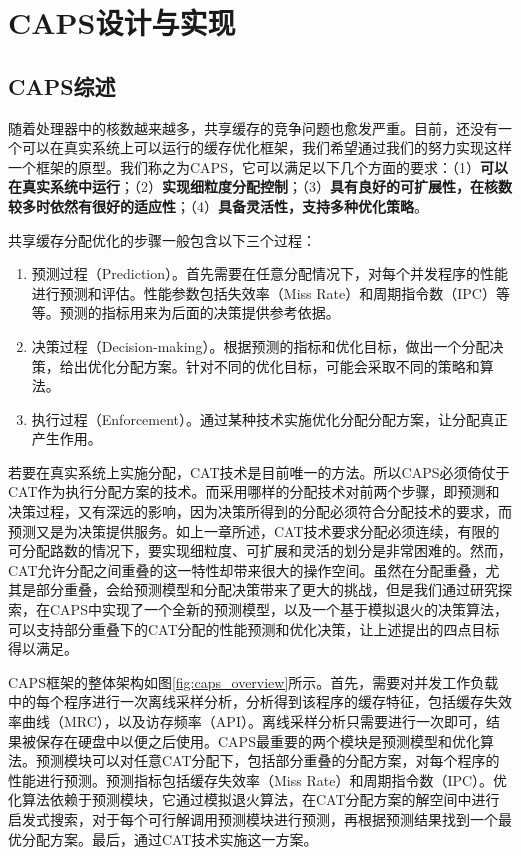 
\chapter{CAPS设计与实现} \label{chap:design}
\section{CAPS综述}
随着处理器中的核数越来越多，共享缓存的竞争问题也愈发严重。目前，还没有一个可以在真实系统上可以运行的缓存优化框架，我们希望通过我们的努力实现这样一个框架的原型。我们称之为CAPS，它可以满足以下几个方面的要求：（1）\textbf{可以在真实系统中运行}；（2）\textbf{实现细粒度分配控制}；（3）\textbf{具有良好的可扩展性，在核数较多时依然有很好的适应性}；（4）\textbf{具备灵活性，支持多种优化策略}。

共享缓存分配优化的步骤一般包含以下三个过程：
\begin{enumerate}
\item 预测过程（Prediction）。首先需要在任意分配情况下，对每个并发程序的性能进行预测和评估。性能参数包括失效率（Miss Rate）和周期指令数（IPC）等等。预测的指标用来为后面的决策提供参考依据。
\item 决策过程（Decision-making）。根据预测的指标和优化目标，做出一个分配决策，给出优化分配方案。针对不同的优化目标，可能会采取不同的策略和算法。
\item 执行过程（Enforcement）。通过某种技术实施优化分配分配方案，让分配真正产生作用。
\end{enumerate}

若要在真实系统上实施分配，CAT技术是目前唯一的方法。所以CAPS必须倚仗于CAT作为执行分配方案的技术。而采用哪样的分配技术对前两个步骤，即预测和决策过程，又有深远的影响，因为决策所得到的分配必须符合分配技术的要求，而预测又是为决策提供服务。如上一章所述，CAT技术要求分配必须连续，有限的可分配路数的情况下，要实现细粒度、可扩展和灵活的划分是非常困难的。然而，CAT允许分配之间重叠的这一特性却带来很大的操作空间。虽然在分配重叠，尤其是部分重叠，会给预测模型和分配决策带来了更大的挑战，但是我们通过研究探索，在CAPS中实现了一个全新的预测模型，以及一个基于模拟退火的决策算法，可以支持部分重叠下的CAT分配的性能预测和优化决策，让上述提出的四点目标得以满足。

CAPS框架的整体架构如图\ref{fig:caps_overview}所示。首先，需要对并发工作负载中的每个程序进行一次离线采样分析，分析得到该程序的缓存特征，包括缓存失效率曲线（MRC），以及访存频率（API）。离线采样分析只需要进行一次即可，结果被保存在硬盘中以便之后使用。CAPS最重要的两个模块是预测模型和优化算法。预测模块可以对任意CAT分配下，包括部分重叠的分配方案，对每个程序的性能进行预测。预测指标包括缓存失效率（Miss Rate）和周期指令数（IPC）。优化算法依赖于预测模块，它通过模拟退火算法，在CAT分配方案的解空间中进行启发式搜索，对于每个可行解调用预测模块进行预测，再根据预测结果找到一个最优分配方案。最后，通过CAT技术实施这一方案。

